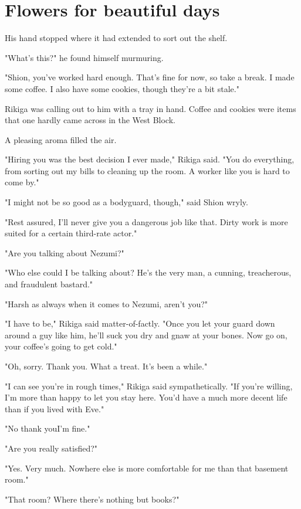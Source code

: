 
\chapter{Flowers for beautiful days}

His hand stopped where it had extended to sort out the shelf.

"What's this?" he found himself murmuring.

"Shion, you've worked hard enough. That's fine for now, so take a break. I made some coffee. I also have some cookies, though they're a bit stale."

Rikiga was calling out to him with a tray in hand. Coffee and cookies were items that one hardly came across in the West Block.

A pleasing aroma filled the air.

"Hiring you was the best decision I ever made," Rikiga said. "You do everything, from sorting out my bills to cleaning up the room. A worker like you is hard to come by."

"I might not be so good as a bodyguard, though," said Shion wryly.

"Rest assured, I'll never give you a dangerous job like that. Dirty work is more suited for a certain third-rate actor."

"Are you talking about Nezumi?"

"Who else could I be talking about? He's the very man, a cunning, treacherous, and fraudulent bastard."

"Harsh as always when it comes to Nezumi, aren't you?"

"I have to be," Rikiga said matter-of-factly. "Once you let your guard down around a guy like him, he'll suck you dry and gnaw at your bones. Now go on, your coffee's going to get cold."

"Oh, sorry. Thank you. What a treat. It's been a while."

"I can see you're in rough times," Rikiga said sympathetically. "If you're willing, I'm more than happy to let you stay here. You'd have a much more decent life than if you lived with Eve."

"No thank you\el I'm fine."

"Are you really satisfied?"

"Yes. Very much. Nowhere else is more comfortable for me than that basement room."

"That room? Where there's nothing but books?"

